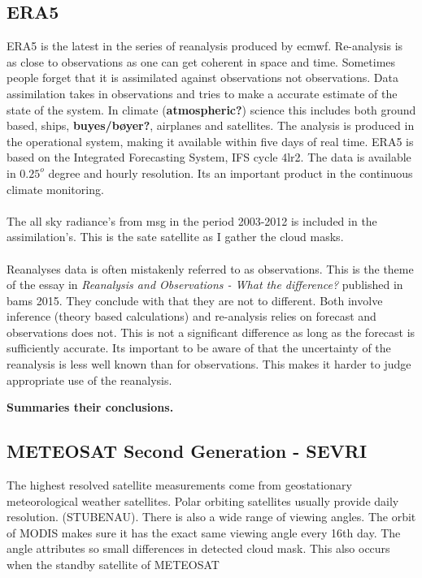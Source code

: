 \subsection{ERA5} \label{sec:era5}
ERA5 is the latest in the series of reanalysis produced by \acrfull{ecmwf}. Re-analysis is as close to observations as one can get coherent in space and time. Sometimes people forget that it is assimilated against observations not observations. Data assimilation takes in observations and tries to make a accurate estimate of the state of the system. In climate (\textbf{atmospheric?}) science this includes both ground based, ships, \textbf{buyes/bøyer?}, airplanes and satellites. The analysis is produced in the operational system, making it available within five days of real time. ERA5 is based on the Integrated Forecasting System, IFS cycle 4lr2. The data is available in $0.25^o$ degree and hourly resolution. Its an important product in the continuous climate monitoring.  
\\ \\
The all sky radiance's from \acrfull{msg} in the period 2003-2012 is included in the assimilation's. This is the sate satellite as I gather the cloud masks.
\\ \\ 
Reanalyses data is often mistakenly referred to as observations. This is the theme of the essay in \textit{Reanalysis and Observations - What the difference?} published in \acrfull{bams} 2015. They conclude with that they are not to different. Both involve inference (theory based calculations) and re-analysis relies on forecast and observations does not. This is not a significant difference as long as the forecast is sufficiently accurate. Its important to be aware of that the uncertainty of the reanalysis is less well known than for observations. This makes it harder to judge appropriate use of the reanalysis. 

\textbf{Summaries their conclusions. }  
 

\subsection{METEOSAT Second Generation - SEVRI} \label{sec:meteosat}
The highest resolved satellite measurements come from geostationary meteorological weather satellites. Polar orbiting satellites usually provide daily resolution. (STUBENAU). There is also a wide range of viewing angles. The orbit of MODIS makes sure it has the exact same viewing angle every 16th day. The angle attributes so small differences in detected cloud mask. This also occurs when the standby satellite of METEOSAT 

